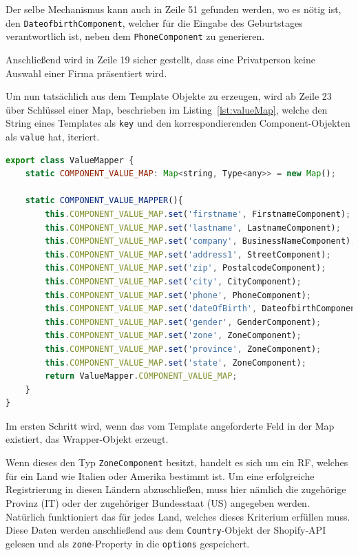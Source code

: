 Der selbe Mechanismus kann auch in Zeile 51 gefunden werden, wo es nötig ist, den \texttt{DateofbirthComponent}, welcher für die Eingabe des Geburtstages verantwortlich ist, neben dem \texttt{PhoneComponent} zu generieren.

Anschließend wird in Zeile 19 sicher gestellt, dass eine Privatperson keine Auswahl einer Firma präsentiert wird.

Um nun tatsächlich aus dem Template Objekte zu erzeugen, wird ab Zeile 23 über Schlüssel einer Map, beschrieben im Listing~\ref{lst:valueMap}, welche den String eines Templates als \texttt{key} und den korrespondierenden Component-Objekten als \texttt{value} hat, iteriert. 

\begin{lstlisting}[caption={valueMap in der \texttt{analyzeRow()}-Methode}, language=JavaScript,label={lst:valueMap}]
export class ValueMapper {
	static COMPONENT_VALUE_MAP: Map<string, Type<any>> = new Map();
	
	static COMPONENT_VALUE_MAPPER(){
		this.COMPONENT_VALUE_MAP.set('firstname', FirstnameComponent);
		this.COMPONENT_VALUE_MAP.set('lastname', LastnameComponent);
		this.COMPONENT_VALUE_MAP.set('company', BusinessNameComponent);
		this.COMPONENT_VALUE_MAP.set('address1', StreetComponent);
		this.COMPONENT_VALUE_MAP.set('zip', PostalcodeComponent);
		this.COMPONENT_VALUE_MAP.set('city', CityComponent);
		this.COMPONENT_VALUE_MAP.set('phone', PhoneComponent);
		this.COMPONENT_VALUE_MAP.set('dateOfBirth', DateofbirthComponent);
		this.COMPONENT_VALUE_MAP.set('gender', GenderComponent);
		this.COMPONENT_VALUE_MAP.set('zone', ZoneComponent);
		this.COMPONENT_VALUE_MAP.set('province', ZoneComponent);
		this.COMPONENT_VALUE_MAP.set('state', ZoneComponent);
		return ValueMapper.COMPONENT_VALUE_MAP;
	}
}
\end{lstlisting}

Im ersten Schritt wird, wenn das vom Template angeforderte Feld in der Map existiert, das Wrapper-Objekt erzeugt. 

Wenn dieses den Typ \texttt{ZoneComponent} besitzt, handelt es sich um ein RF, welches für ein Land wie Italien oder Amerika bestimmt ist. Um eine erfolgreiche Registrierung in diesen Ländern abzuschließen, muss hier nämlich die zugehörige Provinz (IT) oder der zugehöriger Bundesstaat (US) angegeben werden. Natürlich funktioniert das für jedes Land, welches dieses Kriterium erfüllen muss. Diese Daten werden anschließend aus dem \texttt{Country}-Objekt der Shopify-API gelesen und als \texttt{zone}-Property in die \texttt{options} gespeichert. 

